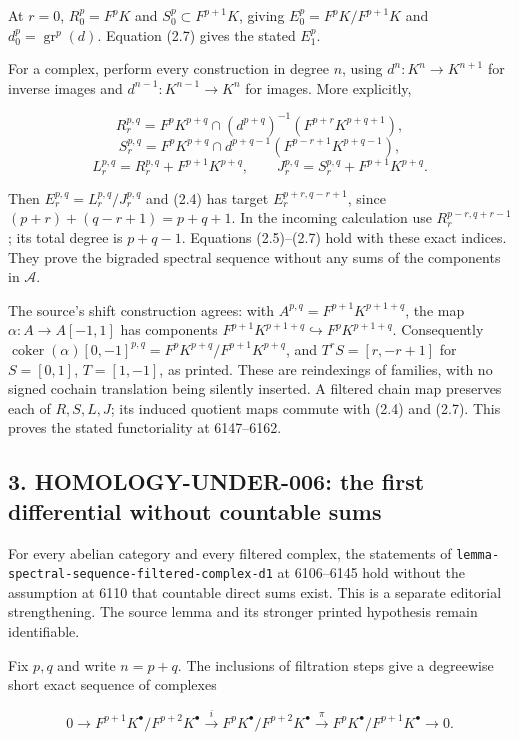 \documentclass[11pt]{article}
\begin{document}
At \(r=0\), \(R_0^p=F^pK\) and \(S_0^p\subset F^{p+1}K\), giving \(E_0^p=F^pK/F^{p+1}K\) and \(d_0^p=\operatorname{gr}^p(d)\). Equation (2.7) gives the stated \(E_1^p\).

For a complex, perform every construction in degree \(n\), using \(d^n:K^n\to K^{n+1}\) for inverse images and \(d^{n-1}:K^{n-1}\to K^n\) for images. More explicitly,

\[
R_r^{p,q}=F^pK^{p+q}\cap(d^{p+q})^{-1}(F^{p+r}K^{p+q+1}),
\] \[
S_r^{p,q}=F^pK^{p+q}\cap d^{p+q-1}(F^{p-r+1}K^{p+q-1}),
\] \[
L_r^{p,q}=R_r^{p,q}+F^{p+1}K^{p+q},\qquad
J_r^{p,q}=S_r^{p,q}+F^{p+1}K^{p+q}.
\]

Then \(E_r^{p,q}=L_r^{p,q}/J_r^{p,q}\) and (2.4) has target \(E_r^{p+r,q-r+1}\), since \((p+r)+(q-r+1)=p+q+1\). In the incoming calculation use \(R_r^{p-r,q+r-1}\); its total degree is \(p+q-1\). Equations (2.5)--(2.7) hold with these exact indices. They prove the bigraded spectral sequence without any sums of the components in \(\mathcal A\).

The source's shift construction agrees: with \(A^{p,q}=F^{p+1}K^{p+1+q}\), the map \(\alpha:A\to A[-1,1]\) has components \(F^{p+1}K^{p+1+q}\hookrightarrow F^pK^{p+1+q}\). Consequently \(\operatorname{coker}(\alpha)[0,-1]^{p,q}
=F^pK^{p+q}/F^{p+1}K^{p+q}\), and \(T^rS=[r,-r+1]\) for \(S=[0,1]\), \(T=[1,-1]\), as printed. These are reindexings of families, with no signed cochain translation being silently inserted. A filtered chain map preserves each of \(R,S,L,J\); its induced quotient maps commute with (2.4) and (2.7). This proves the stated functoriality at 6147--6162.

\subsection{3. HOMOLOGY-UNDER-006: the first differential without countable sums}\label{note-06-homology-under-006-the-first-differential-without-countable-sums}

For every abelian category and every filtered complex, the statements of \texttt{lemma-spectral-sequence-filtered-complex-d1} at 6106--6145 hold without the assumption at 6110 that countable direct sums exist. This is a separate editorial strengthening. The source lemma and its stronger printed hypothesis remain identifiable.

Fix \(p,q\) and write \(n=p+q\). The inclusions of filtration steps give a degreewise short exact sequence of complexes

\[
0\longrightarrow F^{p+1}K^\bullet/F^{p+2}K^\bullet
\xrightarrow{i}F^pK^\bullet/F^{p+2}K^\bullet
\xrightarrow{\pi}F^pK^\bullet/F^{p+1}K^\bullet
\longrightarrow0.                         \tag{3.1}
\]
\end{document}
